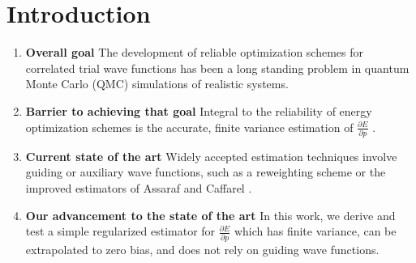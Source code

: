 \documentclass{article}
\begin{document}
\section{Introduction}
\begin{enumerate}
\item \textbf{Overall goal } The development of reliable optimization schemes for correlated trial wave functions has been a long standing problem in quantum Monte Carlo (QMC) simulations of realistic systems.

\item \textbf{Barrier to achieving that goal } Integral to the reliability of energy optimization schemes is the accurate, finite variance estimation of $\frac{\partial E}{\partial p}$ \cite{PhysRevB.64.024512, doi:10.1063/1.1604379, Toulouse2007}.

\item \textbf{Current state of the art} Widely accepted estimation techniques involve guiding or auxiliary wave functions, such as a reweighting scheme \cite{Attaccalite2008, Avella} or the improved estimators of Assaraf and Caffarel \cite{doi:10.1063/1.1286598, Assaraf2003}.

\item \textbf{Our advancement to the state of the art } In this work, we derive and test a simple regularized estimator for $\frac{\partial E}{\partial p}$ which has finite variance, can be extrapolated to zero bias, and does not rely on guiding wave functions.
\end{enumerate}
\end{document}
